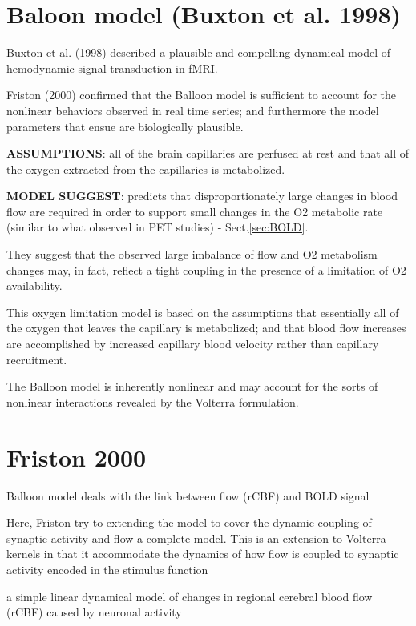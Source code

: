 \section{Baloon model (Buxton et al. 1998)}

Buxton et al. (1998) described a plausible and compelling
dynamical model of hemodynamic signal transduction
in fMRI.

Friston (2000) confirmed that the Balloon model is sufficient to account for the
nonlinear behaviors observed in real time series; and furthermore the model
parameters that ensue are biologically plausible.


{\bf ASSUMPTIONS}: all of the brain capillaries are perfused at rest and that
all of the oxygen extracted from the capillaries is metabolized.

{\bf MODEL SUGGEST}: predicts that disproportionately large changes in blood
flow are required in order to support small changes in the O2 metabolic rate
(similar to what observed in PET studies) - Sect.\ref{sec:BOLD}.

They suggest that the observed large imbalance of flow and O2 metabolism changes
may, in fact, reflect a tight coupling in the presence of a limitation of O2
availability.


This oxygen limitation model is based on the assumptions that essentially all of
the oxygen that leaves the capillary is metabolized; and that blood flow
increases are accomplished by increased capillary blood velocity rather than
capillary recruitment.


The Balloon model is inherently nonlinear and may
account for the sorts of nonlinear interactions revealed
by the Volterra formulation.


\section{Friston 2000}


Balloon model deals with the link between flow (rCBF) and BOLD signal

Here, Friston try to  extending the model to cover the dynamic coupling of
synaptic activity and flow a complete model. This is an extension to Volterra
kernels in that it accommodate the dynamics of how flow is coupled to synaptic
activity encoded in the stimulus function

a simple linear dynamical model of changes in regional cerebral blood flow
(rCBF) caused by neuronal activity




